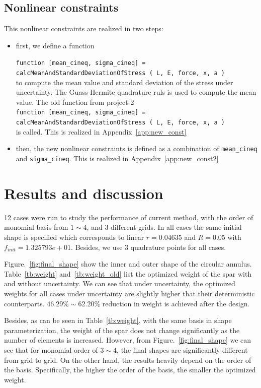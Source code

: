 \documentclass[a4paper]{article}
\begin{document}
\subsection{Nonlinear constraints}
This nonlinear constraints are realized in two steps:
\begin{itemize}
  \item first, we define a function
  
  \hspace{10 mm}\texttt{function [mean\_cineq, sigma\_cineq] = calcMeanAndStandardDeviationOfStress ( L, E, force, x, a )}\\
  to compute the mean value and standard deviation of the stress under uncertainty. The Guass-Hermite quadrature ruls is used to compute the mean value. The old function from project-2 \\
  \texttt{function [mean\_cineq, sigma\_cineq] = calcMeanAndStandardDeviationOfStress ( L, E, force, x, a )}\\
   is called. This is realized in Appendix~\ref{app:new_const}
  \item then, the new nonlinear constraints is defined as a combination of \texttt{mean\_cineq} and \texttt{sigma\_cineq}. This is realized in Appendix~\ref{app:new_const2}
\end{itemize}

\section{Results and discussion}
12 cases were run to study the performance of current method, with the order of monomial basis from $1\sim 4$, and 3 different grids. In all cases the same initial shape is specified which corresponds to linear $r=0.04635$ and $R=0.05$ with $f_{init} = 1.325793e+01$. Besides, we use 3 quadrature points for all cases. 

Figure.~\ref{fig:final_shape} show the inner and outer shape of the circular annulus. Table~\ref{tb:weight} and~\ref{tb:weight_old} list the optimized weight of the spar with and without uncertainty. We can see that under uncertainty, the optimized weights for all cases under uncertainty are slightly higher that their deterministic counterparts. $46.29\% \sim 62.20\%$ reduction in weight is achieved after the design.

Besides, as can be seen in Table~\ref{tb:weight}, with the same basis in shape parameterization, the weight of the spar does not change significantly as the number of elements is increased. However, from Figure.~\ref{fig:final_shape} we can see that for monomial order of $3\sim 4$, the final shapes are significantly different from grid to grid.
On the other hand, the results heavily depend on the order of the basis. Specifically, the higher the order of the basis, the smaller the optimized weight.
\end{document}
